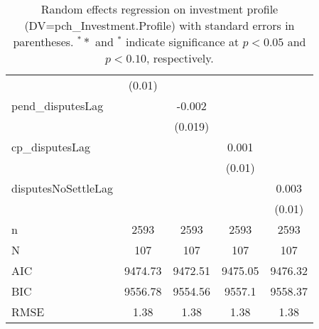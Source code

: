 \begin{table}[ht]
\begin{tabular}{lcccc}
   & (0.01) &  &  &  \\ 
  pend\_disputesLag &  & -0.002 &  &  \\ 
   &  & (0.019) &  &  \\ 
  cp\_disputesLag &  &  & 0.001 &  \\ 
   &  &  & (0.01) &  \\ 
  disputesNoSettleLag &  &  &  & 0.003 \\ 
   &  &  &  & (0.01) \\ 
   \hline
n & 2593 & 2593 & 2593 & 2593 \\ 
  N & 107 & 107 & 107 & 107 \\ 
  AIC & 9474.73 & 9472.51 & 9475.05 & 9476.32 \\ 
  BIC & 9556.78 & 9554.56 & 9557.1 & 9558.37 \\ 
  RMSE & 1.38 & 1.38 & 1.38 & 1.38 \\ 
   \hline
\hline
\end{tabular}
\caption{Random effects regression on investment profile (DV=pch\_Investment.Profile) with standard errors in parentheses. $^**$ and $^*$ indicate significance at $p< 0.05 $ and $p< 0.10 $, respectively.} 
\end{table}
